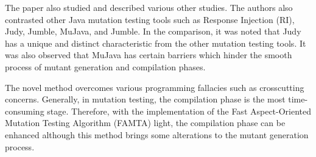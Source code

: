 The paper also studied and described various other studies. The authors also contrasted other Java mutation testing tools such as Response Injection (RI), Judy, Jumble, MuJava, and Jumble. In the comparison, it was noted that Judy has a unique and distinct characteristic from the other mutation testing tools. It was also observed that MuJava has certain barriers which hinder the smooth process of mutant generation and compilation phases.\par 
The novel method overcomes various programming fallacies such as crosscutting concerns. Generally, in mutation testing, the compilation phase is the most time-consuming stage. Therefore, with the implementation of the Fast Aspect-Oriented Mutation Testing Algorithm (FAMTA) light, the compilation phase can be enhanced although this method brings some alterations to the mutant generation process.\\

